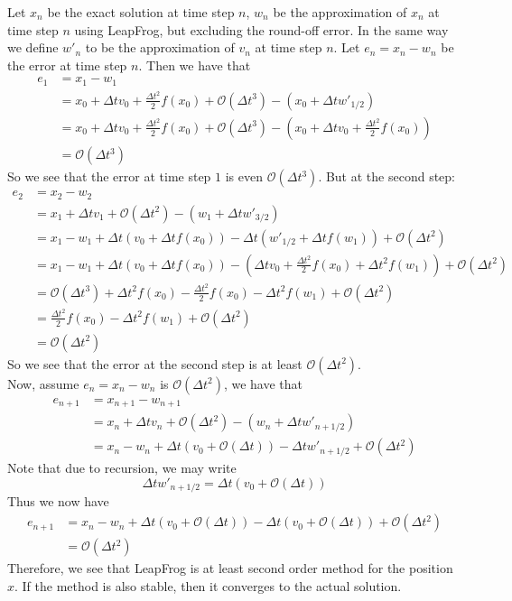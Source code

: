 \documentclass{article}
\begin{document}
Let $x_n$ be the exact solution at time step $n$, $w_n$ be the approximation of $x_n$ at time step $n$ using LeapFrog, but excluding the round-off error. In the same way we define $w'_n$ to be the approximation of $v_n$ at time step $n$. Let $e_n=x_n-w_n$ be the error at time step $n$. Then we have that
\begin{align*}
e_1&=x_1-w_1\\
   &=x_0+\Delta t v_0+\frac{\Delta t^2}{2}f(x_0)+\mathcal{O}(\Delta t^3)-(x_0+\Delta tw'_{1/2})\\
   &=x_0+\Delta t v_0+\frac{\Delta t^2}{2}f(x_0)+\mathcal{O}(\Delta t^3)-(x_0+\Delta tv_0+\frac{\Delta t^2}{2}f(x_0))\\
   &=\mathcal{O}(\Delta t^3)
\end{align*}
So we see that the error at time step $1$ is even $\mathcal{O}(\Delta t^3)$. But at the second step:
\begin{align*}
e_2&=x_2-w_2\\
   &=x_1+\Delta tv_1 +\mathcal{O}(\Delta t^2)-(w_1+\Delta t w'_{3/2})\\
   &=x_1-w_1+\Delta t (v_0+\Delta t f(x_0))-\Delta t(w'_{1/2}+\Delta t f(w_1))+\mathcal{O}(\Delta t^2)\\
   &=x_1-w_1+\Delta t (v_0+\Delta t f(x_0))-(\Delta t v_0+ \frac{\Delta t^2}{2}f(x_0)+\Delta t^2 f(w_1))+\mathcal{O}(\Delta t^2)\\
   &=\mathcal{O}(\Delta t ^3)+\Delta t^2f(x_0)-\frac{\Delta t^2}{2}f(x_0)-\Delta t^2f(w_1)+\mathcal{O}(\Delta t^2)\\
   &=\frac{\Delta t^2}{2}f(x_0)-\Delta t^2f(w_1)+\mathcal{O}(\Delta t^2)\\
   &=\mathcal{O}(\Delta t^2)
\end{align*}
So we see that the error at the second step is at least $\mathcal{O}(\Delta t^2)$.\\
Now, assume $e_n=x_n-w_n$ is $\mathcal{O}(\Delta t^2)$, we have that
\begin{align*}
e_{n+1}&=x_{n+1}-w_{n+1}\\
	   &=x_n+\Delta t v_n+\mathcal{O}(\Delta t^2)-(w_n+\Delta t w'_{n+1/2})\\
	   &=x_n-w_n+\Delta t (v_0+\mathcal{O}(\Delta t))-\Delta t w'_{n+1/2}+\mathcal{O}(\Delta t^2)
\end{align*}
Note that due to recursion, we may write\[\Delta t w'_{n+1/2}=\Delta t(v_0+\mathcal{O}(\Delta t))\]
Thus we now have
\begin{align*}
e_{n+1}&=x_n-w_n+\Delta t (v_0+\mathcal{O}(\Delta t))-\Delta t(v_0+\mathcal{O}(\Delta t))+\mathcal{O}(\Delta t^2)\\
	   &=\mathcal{O}(\Delta t^2)
\end{align*}
Therefore, we see that LeapFrog is at least second order method for the position $x$. If the method is also stable, then it converges to the actual solution.\\
\end{document}
